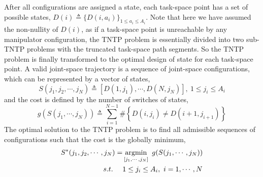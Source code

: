 \documentclass[letterpaper, 10 pt, conference]{ieeeconf}  %
\begin{document}
After all configurations are assigned a state, each task-space point has a set of possible states, $D(i)\triangleq \{D(i, a_i)\}_{1\leq a_i\leq A_i}$. 
Note that here we have assumed the non-nullity of $D(i)$, as if a task-space point is unreachable by any manipulator configuration, the TNTP problem is essentially divided into two sub-TNTP problems with the truncated task-space path segments. 
So the TNTP problem is finally transformed to the optimal design of state for each task-space point. 
A valid joint-space trajectory is a sequence of joint-space configurations, which can be represented by a vector of states,
\begin{equation}
S(j_1, j_2, \cdots, j_N) \triangleq [D(1, j_1), \cdots, D(N, j_N)],\ 1\leq j_i\leq A_i
\end{equation}
and the cost is defined by the number of switches of states, 
\begin{equation}\label{equ:cost}
g\left(S(j_1, \cdots, j_N)\right) \triangleq \sum\limits_{i = 1}^{N-1}\#\left\{D(i, j_i)\neq D(i+1, j_{i+1})\right\}
\end{equation}
The optimal solution to the TNTP problem is to find all admissible sequences of configurations such that the cost is the globally minimum, 
\begin{equation}
\begin{aligned}
S^*(j_1, j_2, \cdots, j_N) = &\mathop{\rm argmin}\limits_{[j_1, \cdots, j_N]}~g(S(j_1, \cdots, j_N))\\
s.t.~~~~ &1\leq j_i\leq A_i,\ i = 1, \cdots, N
\end{aligned}
\end{equation}





\end{document}
